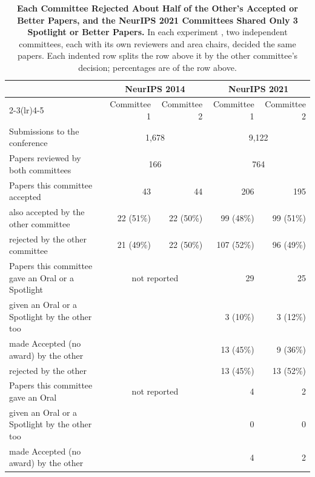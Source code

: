 \documentclass{article}
\begin{document}
\begin{table}[b]
\centering
\small
\caption{\textbf{Each Committee Rejected About Half of the Other's Accepted or Better Papers, and the NeurIPS 2021 Committees Shared Only 3 Spotlight or Better Papers.} In each experiment \citep{lawrence2014nips,cortes2021inconsistency,beygelzimer2023neurips}, two independent committees, each with its own reviewers and area chairs, decided the same papers. Each indented row splits the row above it by the other committee's decision; percentages are of the row above.}
\label{tab:experiments}
\setlength{\tabcolsep}{3pt}
\begin{tabular}{lrrrr}
\toprule
 & \multicolumn{2}{c}{NeurIPS 2014} & \multicolumn{2}{c}{NeurIPS 2021} \\
\cmidrule(lr){2-3}\cmidrule(lr){4-5}
 & Committee 1 & Committee 2 & Committee 1 & Committee 2 \\
\midrule
Submissions to the conference & \multicolumn{2}{c}{1,678} & \multicolumn{2}{c}{9,122} \\
Papers reviewed by both committees & \multicolumn{2}{c}{166} & \multicolumn{2}{c}{764} \\
\addlinespace
Papers this committee accepted & 43 & 44 & 206 & 195 \\
\quad also accepted by the other committee & 22 (51\%) & 22 (50\%) & 99 (48\%) & 99 (51\%) \\
\quad rejected by the other committee & 21 (49\%) & 22 (50\%) & 107 (52\%) & 96 (49\%) \\
\addlinespace
Papers this committee gave an Oral or a Spotlight & \multicolumn{2}{c}{not reported} & 29 & 25 \\
\quad given an Oral or a Spotlight by the other too & & & 3 (10\%) & 3 (12\%) \\
\quad made Accepted (no award) by the other & & & 13 (45\%) & 9 (36\%) \\
\quad rejected by the other & & & 13 (45\%) & 13 (52\%) \\
\addlinespace
Papers this committee gave an Oral & \multicolumn{2}{c}{not reported} & 4 & 2 \\
\quad given an Oral or a Spotlight by the other too & & & 0 & 0 \\
\quad made Accepted (no award) by the other & & & 4 & 2 \\
\bottomrule
\end{tabular}
\end{table}
\end{document}

